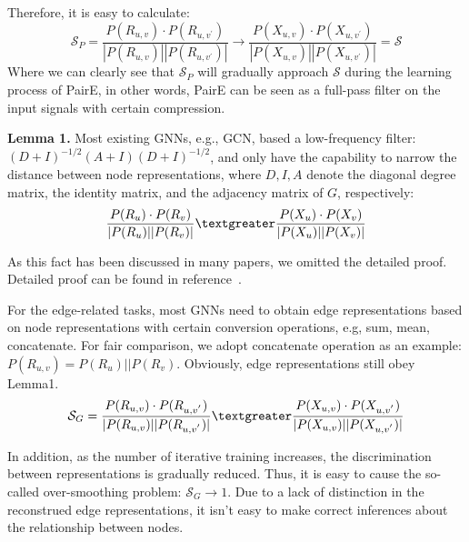 \documentclass[10pt,journal,compsoc]{IEEEtran}
\begin{document}
Therefore, it is easy to calculate: 
   $$\mathcal{S}_P = \frac{P(R_{u,v})\cdot P(R_{u,v^{'}})}{|P(R_{u,v})||P(R_{u,v^{'}})|} \rightarrow \frac{P(X_{u,v})\cdot P(X_{u,v^{'}})}{|P(X_{u,v})||P(X_{u,v^{'}})|} = \mathcal{S}$$
Where we can clearly see that $\mathcal{S}_P$ will gradually approach $\mathcal{S}$ during the learning process of PairE, in other words, PairE can be seen as a full-pass filter on the input signals with certain compression.

\noindent\textbf{Lemma 1.} Most existing GNNs, e.g., GCN, based a low-frequency filter: $(D+I)^{-1/2}(A+I)(D+I)^{-1/2}$, and only have the capability to narrow the distance between node representations, where $D,I,A$ denote the diagonal degree matrix, the identity matrix, and the adjacency matrix of $G$, respectively:  
$$\frac{P(R_{u})\cdot P(R_{v})}{|P(R_{u})||P(R_{v})|} \textgreater \frac{P(X_u)\cdot P(X_v)}{|P(X_u)||P(X_v)|} $$

As this fact has been discussed in many papers, we omitted the detailed proof. Detailed proof can be found in reference~\cite{bo21}.


For the edge-related tasks, most GNNs need to obtain edge representations based on node representations with certain conversion operations, e.g, sum, mean, concatenate. For fair comparison, we adopt concatenate operation as an example: $P(R_{u,v}) = P(R_{u})||P(R_v)$. Obviously, edge representations still obey Lemma1.
$$\mathcal{S}_G = \frac{P(R_{u,v})\cdot P(R_{u,v^{'}})}{|P(R_{u,v})||P(R_{u,v^{'}})|} \textgreater \frac{P(X_{u,v})\cdot P(X_{u,v^{'}})}{|P(X_{u,v})||P(X_{u,v^{'}})|}$$





In addition, as the number of iterative training increases, the discrimination between representations is gradually reduced. Thus, it is easy to cause the so-called over-smoothing problem: $\mathcal{S}_G \rightarrow 1$. Due to a lack of distinction in the reconstrued edge representations, it isn't easy to make correct inferences about the relationship between nodes.













   
\end{document}
